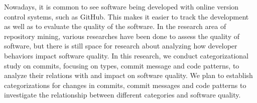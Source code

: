 Nowadays, it is common to see software being developed with online version control systems, such as GitHub. This makes it easier to track the development as well as to evaluate the quality of the software.
In the research area of repository mining, various researches have been done to assess the quality of software, but there is still space for research about analyzing how developer behaviors impact software quality.
In this research, we conduct categorizational study on commits, focusing on types, commit message and code patterns, to analyze their relations with and impact on software quality.
We plan to establish categorizations for changes in commits, commit messages and code patterns to investigate the relationship between different categories and software quality.

